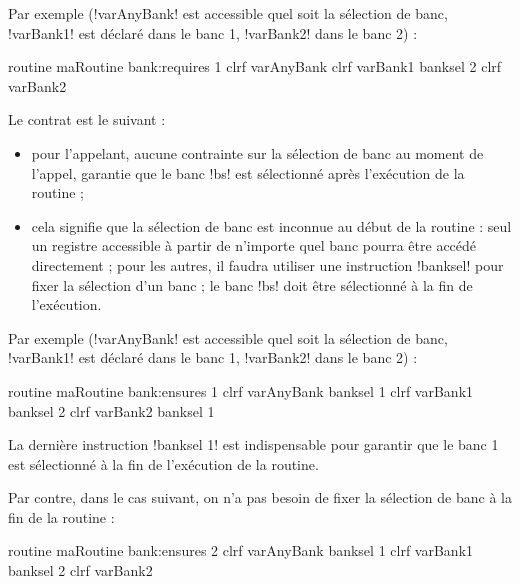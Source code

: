 Par exemple (\pic!varAnyBank! est accessible quel soit la sélection de banc, \pic!varBank1! est déclaré dans le banc 1, \pic!varBank2! dans le banc 2) :
\begin{piccolo}
routine maRoutine bank:requires 1 {
  clrf varAnyBank
  clrf varBank1
  banksel 2
  clrf varBank2
}
\end{piccolo}








Le contrat est le suivant :
\begin{itemize}
  \item pour l'appelant, aucune contrainte sur la sélection de banc au moment de l'appel, garantie que le banc \pic!bs! est sélectionné après l'exécution de la routine ; 
  \item cela signifie que la sélection de banc est inconnue au début de la routine : seul un registre accessible à partir de n'importe quel banc pourra être accédé directement ; pour les autres, il faudra utiliser une instruction \pic!banksel! pour fixer la sélection d'un banc ; le banc \pic!bs! doit être sélectionné à la fin de l'exécution.
\end{itemize}

Par exemple (\pic!varAnyBank! est accessible quel soit la sélection de banc, \pic!varBank1! est déclaré dans le banc 1, \pic!varBank2! dans le banc 2) :
\begin{piccolo}
routine maRoutine bank:ensures 1 {
  clrf varAnyBank
  banksel 1
  clrf varBank1
  banksel 2
  clrf varBank2
  banksel 1
}
\end{piccolo}

La dernière instruction \pic!banksel 1! est indispensable pour garantir que le banc 1 est sélectionné à la fin de l'exécution de la routine.


Par contre, dans le cas suivant, on n'a pas besoin de fixer la sélection de banc à la fin de la routine :
\begin{piccolo}
routine maRoutine bank:ensures 2 {
  clrf varAnyBank
  banksel 1
  clrf varBank1
  banksel 2
  clrf varBank2
}
\end{piccolo}












